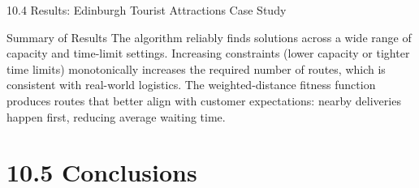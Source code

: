 \documentclass[aspectratio=169,10pt]{beamer}
\begin{document}
\begin{frame}[allowframebreaks]{10.4 Results: Edinburgh Tourist Attractions Case Study}
  \begin{alertblock}{Summary of Results}
    The algorithm reliably finds solutions across a wide range of
    capacity and time-limit settings.  Increasing constraints
    (lower capacity or tighter time limits) monotonically increases
    the required number of routes, which is consistent with
    real-world logistics.  The weighted-distance fitness function
    produces routes that better align with customer expectations:
    nearby deliveries happen first, reducing average waiting time.
  \end{alertblock}

\end{frame}

\section{10.5 Conclusions}
\end{document}
